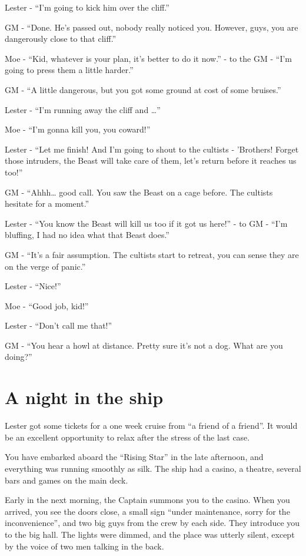 \documentclass[11pt]{article}
\begin{document}
Lester - \enquote{I'm going to kick him over the cliff.}

GM - \enquote{Done. He's passed out, nobody really noticed you. However, guys, you are dangerously close to that cliff.}

Moe - \enquote{Kid, whatever is your plan, it's better to do it now.} - to the GM - \enquote{I'm going to press them a little harder.}

GM - \enquote{A little dangerous, but you got some ground at cost of some bruises.}

Lester - \enquote{I'm running away the cliff and \ldots{}}

Moe - \enquote{I'm gonna kill you, you coward!}

Lester - \enquote{Let me finish! And I'm going to shout to the cultists - 'Brothers! Forget those intruders, the Beast will take care of them, let's return before it reaches us too!}

GM - \enquote{Ahhh\ldots{} good call. You saw the Beast on a cage before. The cultists hesitate for a moment.}

Lester - \enquote{You know the Beast will kill us too if it got us here!} - to GM - \enquote{I'm bluffing, I had no idea what that Beast does.}

GM - \enquote{It's a fair assumption. The cultists start to retreat, you can sense they are on the verge of panic.}

Lester - \enquote{Nice!}

Moe - \enquote{Good job, kid!}

Lester - \enquote{Don't call me that!}

GM - \enquote{You hear a howl at distance. Pretty sure it's not a dog. What are you doing?}

\section{A night in the ship}
\label{sec:one-shot-a-night-in-the-ship}

Lester got some tickets for a one week cruise from \enquote{a friend of a friend}. It would be an excellent opportunity to relax after the stress of the last case.

You have embarked aboard the \enquote{Rising Star} in the late afternoon, and everything was running smoothly as silk. The ship had a casino, a theatre, several bars and games on the main deck.

Early in the next morning, the Captain summons you to the casino. When you arrived, you see the doors close, a small sign \enquote{under maintenance, sorry for the inconvenience}, and two big guys from the crew by each side. They introduce you to the big hall. The lights were dimmed, and the place was utterly silent, except by the voice of two men talking in the back.
\end{document}
